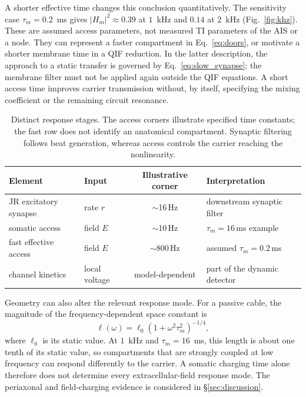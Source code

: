 \documentclass[11pt,a4paper]{article}
\begin{document}
A shorter effective time changes this conclusion quantitatively. The sensitivity
case $\tau_m=0.2$~ms gives $|H_m|^2\approx0.39$ at $1$~kHz and $0.14$ at $2$~kHz
(Fig.~\ref{fig:khz}). These are assumed access parameters, not measured TI
parameters of the AIS or a node. They can represent a faster compartment in
Eq.~\eqref{eq:doors}, or motivate a shorter membrane time in a QIF reduction.
In the latter description, the approach to a static transfer is governed by
Eq.~\eqref{eq:slow_synapse}; the membrane filter must not be applied again outside
the QIF equations. A short access time improves carrier transmission without,
by itself, specifying the mixing coefficient or the remaining circuit resonance.

\begin{table}[h]
\centering\small
\renewcommand{\arraystretch}{1.15}
\begin{tabular}{@{}p{4.3cm} l c p{3.3cm}@{}}
\toprule
Element & Input & Illustrative corner & Interpretation \\
\midrule
JR excitatory synapse & rate $r$ & $\sim$16\,Hz & downstream synaptic filter \\
somatic access & field $E$ & $\sim$10\,Hz & $\tau_m=16$\,ms example \\
fast effective access & field $E$ & $\sim$800\,Hz & assumed $\tau_m=0.2$\,ms \\
channel kinetics & local voltage & model-dependent & part of the dynamic detector \\
\bottomrule
\end{tabular}
\caption{Distinct response stages. The access corners illustrate specified time
constants; the fast row does not identify an anatomical compartment. Synaptic
filtering follows beat generation, whereas access controls the carrier reaching
the nonlinearity.}
\label{tab:doors}
\end{table}

Geometry can also alter the relevant response mode. For a passive cable, the
magnitude of the frequency-dependent space constant is
\begin{equation}
\ell(\omega)=\ell_0(1+\omega^2\tau_m^2)^{-1/4},
\label{eq:lambda}
\end{equation}
where $\ell_0$ is its static value. At $1$~kHz and $\tau_m=16$~ms, this length
is about one tenth of its static value, so compartments that are strongly coupled
at low frequency can respond differently to the carrier. A somatic charging time
alone therefore does not determine every extracellular-field response mode.
The periaxonal and field-charging evidence is considered in \S\ref{sec:discussion}.
\end{document}
